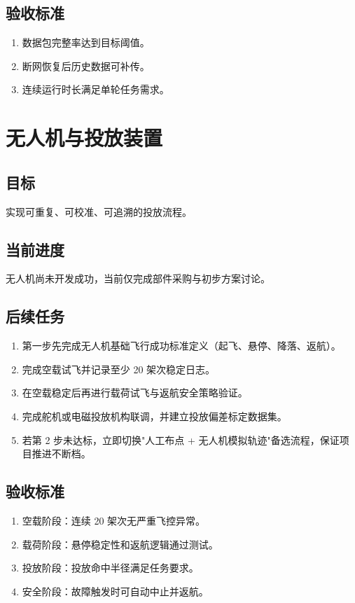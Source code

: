 \documentclass[12pt,a4paper,openany]{ctexrep}
\begin{document}
\subsection{验收标准}

\begin{enumerate}
\item 数据包完整率达到目标阈值。
\item 断网恢复后历史数据可补传。
\item 连续运行时长满足单轮任务需求。
\end{enumerate}

\section{无人机与投放装置}

\subsection{目标}

实现可重复、可校准、可追溯的投放流程。

\subsection{当前进度}

无人机尚未开发成功，当前仅完成部件采购与初步方案讨论。

\subsection{后续任务}

\begin{enumerate}
\item 第一步先完成无人机基础飞行成功标准定义（起飞、悬停、降落、返航）。
\item 完成空载试飞并记录至少 20 架次稳定日志。
\item 在空载稳定后再进行载荷试飞与返航安全策略验证。
\item 完成舵机或电磁投放机构联调，并建立投放偏差标定数据集。
\item 若第 2 步未达标，立即切换"人工布点 + 无人机模拟轨迹"备选流程，保证项目推进不断档。
\end{enumerate}

\subsection{验收标准}

\begin{enumerate}
\item 空载阶段：连续 20 架次无严重飞控异常。
\item 载荷阶段：悬停稳定性和返航逻辑通过测试。
\item 投放阶段：投放命中半径满足任务要求。
\item 安全阶段：故障触发时可自动中止并返航。
\end{enumerate}
\end{document}
